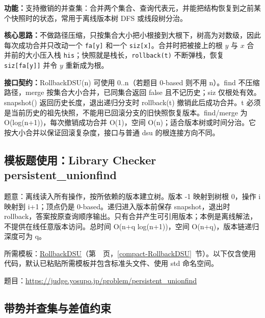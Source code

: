 \noindent\textbf{功能：}\allowbreak 支持撤销的并查集：合并两个集合、查询代表元，并能把结构恢复到之前某个快照时的状态，常用于离线版本树 DFS 或线段树分治。

\textbf{核心思路：}\allowbreak 不做路径压缩，只按集合大小把小根接到大根下，树高为对数级，因此每次成功合并只改动一个 \texttt{fa[y]} 和一个 \texttt{siz[x]}。合并时把被接上的根 $y$ 与 $x$ 合并前的大小压入栈 \texttt{his}；快照就是栈长，\texttt{rollback(t)} 不断弹栈，恢复 \texttt{siz[fa[y]]} 并令 $y$ 重新成为根。



{\sloppy{}\noindent\textbf{接口契约：}RollbackDSU(n) 可使用 0..n（若题目 0-based 则不用 n）。find 不压缩路径，merge 按集合大小合并，已同集合返回 false 且不记历史；siz 仅根处有效。snapshot() 返回历史长度，退出递归分支时 rollback(t) 撤销此后成功合并。t 必须是当前历史的祖先快照，不能用已回滚分支的旧快照恢复版本。find/merge 为 O(log(n+1))，每次撤销成功合并 O(1)，空间 O(n)；适合版本树或时间分治。它按大小合并以保证回滚复杂度，接口与普通 dsu 的根连接方向不同。\par}



\Needspace{551pt}

\subsection*{模板题使用：Library Checker persistent\_unionfind}

\label{usage-example-84}

题意：离线读入所有操作，按所依赖的版本建立树。版本 -1 映射到树根 0，操作 i 映射到 i+1；顶点仍是 0-based。递归进入版本前保存 snapshot，退出时 rollback，答案按原查询顺序输出。只有合并产生可引用版本；本例是离线解法，不提供在线任意版本访问。总时间 O(n+q log(n+1))，空间 O(n+q)，版本链递归深度可为 q。

所需模板：\hyperref[compact-RollbackDSU]{RollbackDSU}（第~\pageref{compact-RollbackDSU}~页，\ref{compact-RollbackDSU}~节）。以下仅含使用代码，默认已粘贴所需模板并包含标准头文件、使用 std 命名空间。

题目：\url{https://judge.yosupo.jp/problem/persistent_unionfind}



\Needspace{536pt}

\subsection{带势并查集与差值约束}\label{compact-PotentialDSU}

